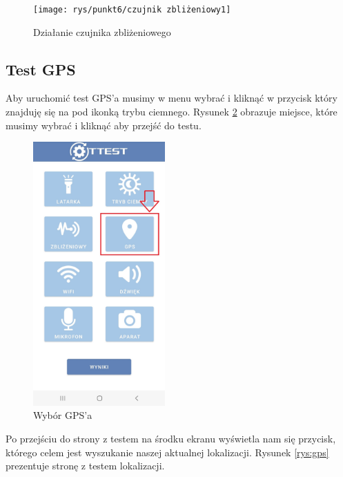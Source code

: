 \begin{figure}[!hbt]
	\begin{center}
		\texttt{[image: rys/punkt6/czujnik zbliżeniowy1]}
		\caption{Działanie czujnika zbliżeniowego}
		\label{rys:czujnik zbliżeniowy1}
	\end{center}
\end{figure}

\newpage


\subsection{Test GPS}

\hspace{0.60cm}Aby uruchomić test GPS'a musimy w menu wybrać i kliknąć w przycisk który znajduję się na pod ikonką trybu ciemnego. Rysunek \ref{rys:menu4} obrazuje miejsce, które musimy wybrać i kliknąć aby przejść do testu.

\begin{figure}[!hbt]
	\begin{center}
		\includegraphics[angle=360, width=0.45\textwidth]{rys/punkt6/menu4}
		\caption{Wybór GPS'a}
		\label{rys:menu4}
	\end{center}
\end{figure}

Po przejściu do strony z testem na środku ekranu  wyświetla nam się przycisk, którego celem jest wyszukanie naszej aktualnej lokalizacji. Rysunek \ref{rys:gps} prezentuje stronę z testem lokalizacji. \\

